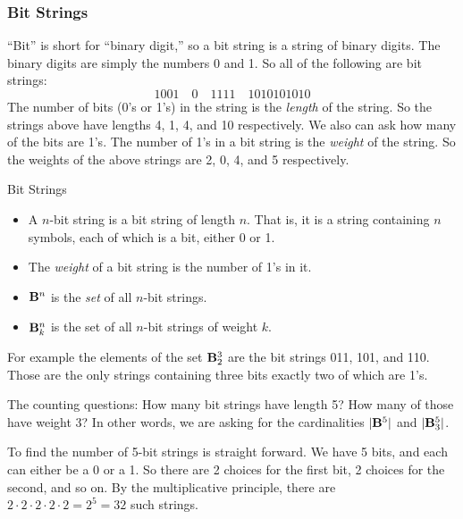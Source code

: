 \documentclass[12pt]{article}
\begin{document}
\subsubsection*{Bit Strings}

``Bit'' is short for ``binary digit,'' so a bit string is a string of binary digits.  The binary digits are simply the numbers 0 and 1.  So all of the following are bit strings:
\[1001 \quad 0 \quad 1111 \quad 1010101010\]
The number of bits (0's or 1's) in the string is the {\em length} of the string.  So the strings above have lengths 4, 1, 4, and 10 respectively.  We also can ask how many of the bits are 1's.  The number of 1's in a bit string is the {\em weight} of the string.  So the weights of the above strings are 2, 0, 4, and 5 respectively.

\begin{defbox}{Bit Strings}
  \begin{itemize}
    \item A $n$-bit string is a bit string of length $n$.  That is, it is a string containing $n$ symbols, each of which is a bit, either 0 or 1.
    \item The {\em weight} of a bit string is the number of 1's in it.
    \item $\mathbf{B}^n$ is the {\em set} of all $n$-bit strings.
    \item $\mathbf{B}^n_k$ is the set of all $n$-bit strings of weight $k$.
  \end{itemize}
\end{defbox}

For example the elements of the set $\mathbf{B}^3_2$ are the bit strings 011, 101, and 110.  Those are the only strings containing three bits exactly two of which are 1's.

The counting questions: How many bit strings have length 5?  How many of those have weight 3?  In other words, we are asking for the cardinalities $|\mathbf{B}^5|$ and $|\mathbf{B}^5_3|$.  

To find the number of 5-bit strings is straight forward.  We have 5 bits, and each can either be a 0 or a 1.  So there are 2 choices for the first bit, 2 choices for the second, and so on.  By the multiplicative principle, there are $2 \cdot 2 \cdot 2\cdot 2 \cdot 2 = 2^5 = 32$ such strings.  
\end{document}
